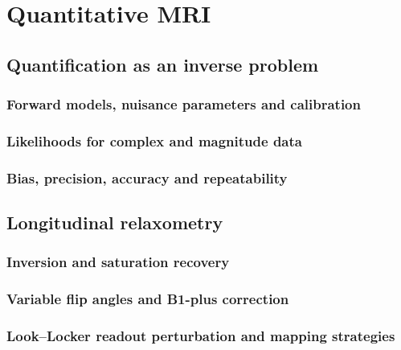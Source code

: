 \chapter{Quantitative MRI}
\label{ch:11}

\section{Quantification as an inverse problem}
\label{sec:11:quantification-as-an-inverse-problem}
\subsection{Forward models, nuisance parameters and calibration}
\subsection{Likelihoods for complex and magnitude data}
\subsection{Bias, precision, accuracy and repeatability}

\section{Longitudinal relaxometry}
\label{sec:11:longitudinal-relaxometry}
\subsection{Inversion and saturation recovery}
\subsection{Variable flip angles and B1-plus correction}
\subsection{Look--Locker readout perturbation and mapping strategies}

